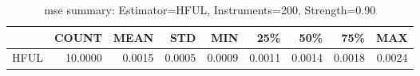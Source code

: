 \begin{table}[ht]
\centering
\caption{mse summary: Estimator=HFUL, Instruments=200, Strength=0.90}
\begin{tabular}{lrrrrrrrr}
\toprule
 & COUNT & MEAN & STD & MIN & 25\% & 50\% & 75\% & MAX \\
\midrule
HFUL & 10.0000 & 0.0015 & 0.0005 & 0.0009 & 0.0011 & 0.0014 & 0.0018 & 0.0024 \\
\bottomrule
\end{tabular}
\end{table}

